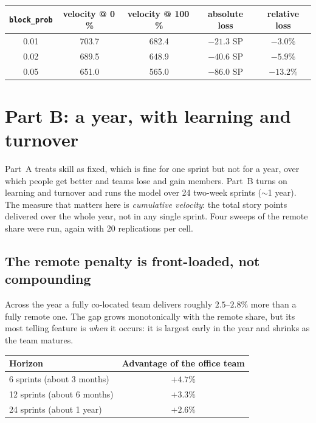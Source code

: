 \documentclass[11pt,a4paper]{article}
\begin{document}
\begin{center}
\begin{tabular}{ccccc}
\toprule
\texttt{block\_prob} & velocity @ 0\,\% & velocity @ 100\,\% & absolute loss & relative loss \\
\midrule
0.01 & 703.7 & 682.4 & $-21.3$ SP & $-3.0\%$ \\
0.02 & 689.5 & 648.9 & $-40.6$ SP & $-5.9\%$ \\
0.05 & 651.0 & 565.0 & $-86.0$ SP & $-13.2\%$ \\
\bottomrule
\end{tabular}
\end{center}

\section{Part B: a year, with learning and turnover}
\label{sec:partB}

Part~A treats skill as fixed, which is fine for one sprint but not for a year, over which people get
better and teams lose and gain members. Part~B turns on learning and turnover and runs the model over
24 two-week sprints ($\sim$1 year). The measure that matters here is \emph{cumulative velocity}: the
total story points delivered over the whole year, not in any single sprint. Four sweeps of the remote
share were run, again with 20 replications per cell.

\subsection{The remote penalty is front-loaded, not compounding}

Across the year a fully co-located team delivers roughly $2.5$--$2.8\%$ more than a fully remote one.
The gap grows monotonically with the remote share, but its most telling feature is \emph{when} it
occurs: it is largest early in the year and shrinks as the team matures.

\begin{center}
\begin{tabular}{lc}
\toprule
Horizon & Advantage of the office team \\
\midrule
6 sprints (about 3 months)  & $+4.7\%$ \\
12 sprints (about 6 months) & $+3.3\%$ \\
24 sprints (about 1 year)   & $+2.6\%$ \\
\bottomrule
\end{tabular}
\end{center}
\end{document}
